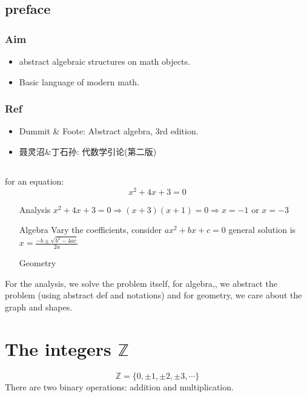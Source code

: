 \documentclass{book}
\begin{document}
\tableofcontents
\chapter{preface}
\section{Aim}
\begin{itemize}
	\item abstract algebraic structures on math objects.
	\item Basic language of modern math.
\end{itemize}
\section{Ref}
\begin{itemize}
	\item Dummit \& Foote: Abstract algebra, 3rd edition.
	\item 聂灵沼\&丁石孙: 代数学引论(第二版)
\end{itemize}
\chapter{}
\section{}
for an equation: $$x^2+4x+3=0$$
\begin{itemize}
	\item [Analysis]$x^2+4x+3=0\Rightarrow(x+3)(x+1)=0\Rightarrow x=-1 $ or $ x=-3$
	\item [Algebra]Vary the coefficients, consider $ax^2+bx+c=0$ general solution is $x=\frac{-b\pm\sqrt{b^2-4ac}}{2a}$
	\item [Geometry]
\end{itemize}
For the analysis, we solve the problem itself, for algebra,, we abstract the problem (using abstract def and notations) and for geometry, we care about the graph and shapes.
\part{The integers $\mathbb{Z}$}
$$\mathbb{Z}=\{0,\pm1,\pm2,\pm3,\cdots\}$$
There are two binary operations: addition and multiplication.
\end{document}
